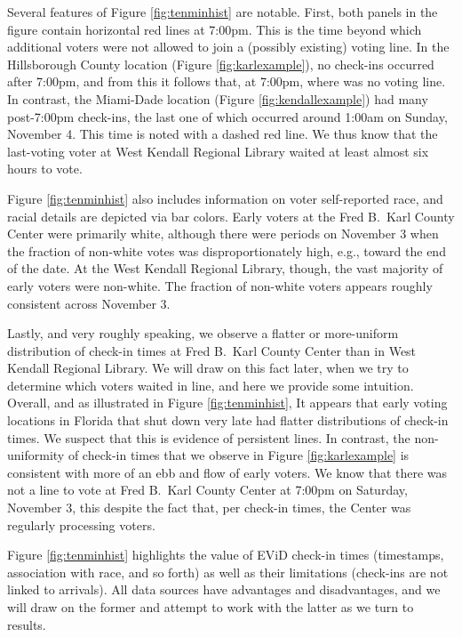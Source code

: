\documentclass[12pt,titlepage]{article}
\begin{document}
Several features of Figure \ref{fig:tenminhist} are notable.  First,
both panels in the figure contain horizontal red lines at 7:00pm.
This is the time beyond which additional voters were not allowed to
join a (possibly existing) voting line.  In the Hillsborough County
location (Figure \ref{fig:karlexample}), no check-ins occurred after
7:00pm, and from this it follows that, at 7:00pm, where was no voting
line.  In contrast, the Miami-Dade location (Figure
\ref{fig:kendallexample}) had many post-7:00pm check-ins, the last one
of which occurred around 1:00am on Sunday, November 4.  This time is
noted with a dashed red line.  We thus know that the last-voting voter
at West Kendall Regional Library waited at least almost six hours to
vote.

Figure \ref{fig:tenminhist} also includes information on voter
self-reported race, and racial details are depicted via bar colors.
Early voters at the Fred B.\ Karl County Center were primarily white,
although there were periods on November 3 when the fraction of
non-white votes was disproportionately high, e.g., toward the end of
the date.  At the West Kendall Regional Library, though, the vast
majority of early voters were non-white.  The fraction of non-white
voters appears roughly consistent across November 3.

Lastly, and very roughly speaking, we observe a flatter or
more-uniform distribution of check-in times at Fred B.\ Karl County
Center than in West Kendall Regional Library.  We will draw on this
fact later, when we try to determine which voters waited in line, and
here we provide some intuition.  Overall, and as illustrated in Figure
\ref{fig:tenminhist}, It appears that early voting locations in
Florida that shut down very late had flatter distributions of check-in
times.  We suspect that this is evidence of persistent lines.  In
contrast, the non-uniformity of check-in times that we observe in
Figure \ref{fig:karlexample} is consistent with more of an ebb and
flow of early voters.  We know that there was not a line to vote at
Fred B.\ Karl County Center at 7:00pm on Saturday, November 3, this
despite the fact that, per check-in times, the Center was regularly
processing voters.

Figure \ref{fig:tenminhist} highlights the value of EViD check-in
times (timestamps, association with race, and so forth) as well as
their limitations (check-ins are not linked to arrivals).  All data
sources have advantages and disadvantages, and we will draw on the
former and attempt to work with the latter as we turn to results.
\end{document}
